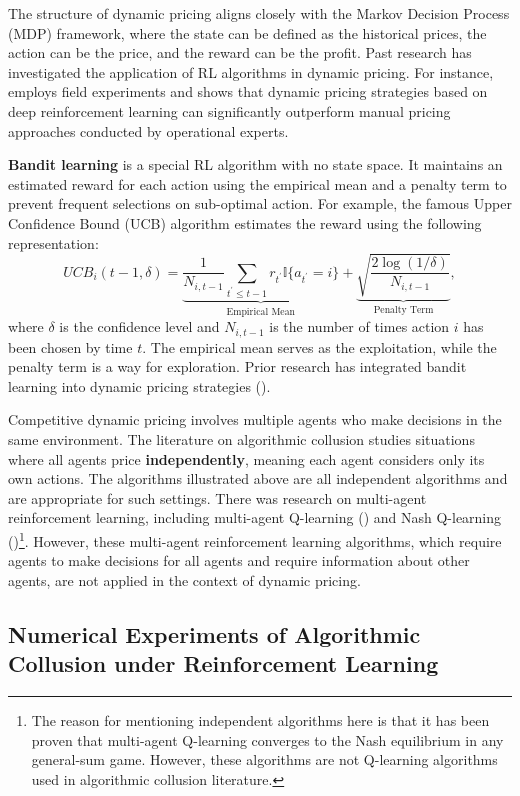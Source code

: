 \documentclass[mnsc,nonblindrev]{workingpaper}
\begin{document}
The structure of dynamic pricing aligns closely with the Markov Decision Process (MDP) framework, where the state can be defined as the historical prices, the action can be the price, and the reward can be the profit. Past research has investigated the application of RL algorithms in dynamic pricing. For instance, \cite{liu2019dynamic} employs field experiments and shows that dynamic pricing strategies based on deep reinforcement learning can significantly outperform manual pricing approaches conducted by operational experts.

\textbf{Bandit learning} is a special RL algorithm with no state space. It maintains an estimated reward for each action using the empirical mean and a penalty term to prevent frequent selections on sub-optimal action. For example, the famous Upper Confidence Bound (UCB) algorithm estimates the reward using the following representation:
\[
UCB_i(t-1,\delta)=\underbrace{\frac{1}{N_{i,t-1}}\sum_{t^{\prime}\leq t-1}r_{t^{\prime}}\mathbb{I}\{a_{t^{\prime}}=i\}}_{\text{Empirical Mean}}+\underbrace{\sqrt{\frac{2\log(1/\delta)}{N_{i,t-1}}}}_{\text{Penalty Term}},
\]
where $\delta$ is the confidence level and $N_{i,t-1}$ is the number of times action $i$ has been chosen by time $t$. The empirical mean serves as the exploitation, while the penalty term is a way for exploration. Prior research has integrated bandit learning into dynamic pricing strategies (\cite{misra2019dynamic}).

Competitive dynamic pricing involves multiple agents who make decisions in the same environment. The literature on algorithmic collusion studies situations where all agents price \textbf{independently}, meaning each agent considers only its own actions. The algorithms illustrated above are all independent algorithms and are appropriate for such settings. There was research on multi-agent reinforcement learning, including multi-agent Q-learning (\cite{hu1998multiagent}) and Nash Q-learning (\cite{hu2003nash})\footnote{The reason for mentioning independent algorithms here is that it has been proven that multi-agent Q-learning converges to the Nash equilibrium in any general-sum game. However, these algorithms are not Q-learning algorithms used in algorithmic collusion literature.}. However, these multi-agent reinforcement learning algorithms, which require agents to make decisions for all agents and require information about other agents, are not applied in the context of dynamic pricing.

\subsection{Numerical Experiments of Algorithmic Collusion under Reinforcement Learning}
\label{subsec:numerical}
\end{document}
